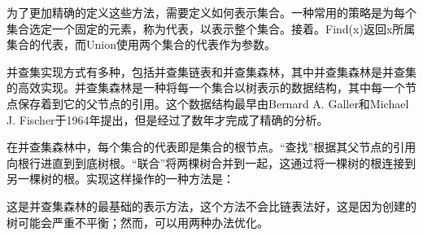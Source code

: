 为了更加精确的定义这些方法，需要定义如何表示集合。一种常用的策略是为每个集合选定一个固定的元素，称为代表，以表示整个集合。接着。Find(x)返回x所属集合的代表，而Union使用两个集合的代表作为参数。


并查集实现方式有多种，包括并查集链表和并查集森林，其中并查集森林是并查集的高效实现。并查集森林是一种将每一个集合以树表示的数据结构，其中每一个节点保存着到它的父节点的引用。这个数据结构最早由Bernard A. Galler和Michael J. Fischer于1964年提出，但是经过了数年才完成了精确的分析。

在并查集森林中，每个集合的代表即是集合的根节点。“查找”根据其父节点的引用向根行进直到到底树根。“联合”将两棵树合并到一起，这通过将一棵树的根连接到另一棵树的根。实现这样操作的一种方法是：

这是并查集森林的最基础的表示方法，这个方法不会比链表法好，这是因为创建的树可能会严重不平衡；然而，可以用两种办法优化。

